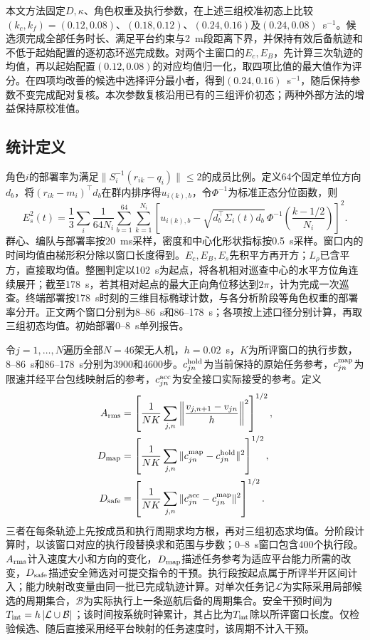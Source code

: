 \documentclass[UTF8,a4paper,11pt,fontset=none]{ctexart}
\begin{document}
本文方法固定$D,\kappa$、角色权重及执行参数，在上述三组校准初态上比较$(k_c,k_f)=(0.12,0.08)$、$(0.18,0.12)$、$(0.24,0.16)$及$(0.24,0.08)$~s$^{-1}$。候选须完成全部任务时长、满足平台约束与2~m段距离下界，并保持有效后备航迹和不低于起始配置的逐初态环巡完成数。对两个主窗口的$E_c,E_B$，先计算三次轨迹的均值，再以起始配置$(0.12,0.08)$的对应均值归一化，取四项比值的最大值作为评分。在四项均改善的候选中选择评分最小者，得到$(0.24,0.16)$~s$^{-1}$，随后保持参数不变完成配对复核。本次参数复核沿用已有的三组评价初态；两种外部方法的增益保持原校准值。

\subsection{统计定义}\label{app:metrics}
角色$i$的部署率为满足$\|S_i^{-1}(r_{ik}-q_i)\|\le2$的成员比例。定义64个固定单位方向$d_b$，将$(r_{ik}-m_i)^\top d_b$在群内排序得$u_{i(k),b}$，令$\Phi^{-1}$为标准正态分位函数，则
\[
 E_s^2(t)=\frac13\sum_i\frac{1}{64N_i}\sum_{b=1}^{64}\sum_{k=1}^{N_i}
 \left[u_{i(k),b}-\sqrt{d_b^\top\Sigma_i(t)d_b}\,
     \Phi^{-1}\!\left(\frac{k-1/2}{N_i}\right)\right]^2 .
\]
群心、编队与部署率按20~ms采样，密度和中心化形状指标按0.5~s采样。窗口内的时间均值由梯形积分除以窗口长度得到。$E_c,E_B,E_s$先积平方再开方；$L_\rho$已含平方，直接取均值。整圈判定以102~s为起点，将各机相对巡查中心的水平方位角连续展开；截至178~s，若其相对起点的最大正向角位移达到$2\pi$，计为完成一次巡查。终端部署按178~s时刻的三维目标椭球计数，与各分析阶段等角色权重的部署率分开。正文两个窗口分别为8--86~s和86--178~s；各项按上述口径分别计算，再取三组初态均值。初始部署0--8~s单列报告。

令$j=1,\ldots,N$遍历全部$N=46$架无人机，$h=0.02$~s，$K$为所评窗口的执行步数，8--86~s和86--178~s分别为3900和4600步。$c^{\rm hold}_{jn}$为当前保持的原始任务参考，$c^{\rm map}_{jn}$为限速并经平台包线映射后的参考，$c^{\rm acc}_{jn}$为安全接口实际接受的参考。定义
\begin{equation}
\begin{aligned}
A_{\rm rms}&=\left[\frac1{NK}\sum_{j,n}\left\|\frac{v_{j,n+1}-v_{jn}}h\right\|^2\right]^{1/2},\\
D_{\rm map}&=\left[\frac1{NK}\sum_{j,n}\|c^{\rm map}_{jn}-c^{\rm hold}_{jn}\|^2\right]^{1/2},\\
D_{\rm safe}&=\left[\frac1{NK}\sum_{j,n}\|c^{\rm acc}_{jn}-c^{\rm map}_{jn}\|^2\right]^{1/2}.
\end{aligned}\label{eq:effort-cost}
\end{equation}
三者在每条轨迹上先按成员和执行周期求均方根，再对三组初态求均值。分阶段计算时，以该窗口对应的执行段替换求和范围与步数；0--8~s窗口包含400个执行段。$A_{\rm rms}$计入速度大小和方向的变化，$D_{\rm map}$描述任务参考为适应平台能力所需的改变，$D_{\rm safe}$描述安全筛选对可提交指令的干预。执行段按起点属于所评半开区间计入；能力映射改变量由同一批已完成轨迹计算。对单次任务记$\mathcal L$为实际采用局部候选的周期集合，$\mathcal B$为实际执行上一条巡航后备的周期集合。安全干预时间为$T_{\rm int}=h\,|\mathcal L\cup\mathcal B|$；该时间按系统时钟累计，其占比为$T_{\rm int}$除以所评窗口长度。仅检验候选、随后直接采用经平台映射的任务速度时，该周期不计入干预。
\end{document}

